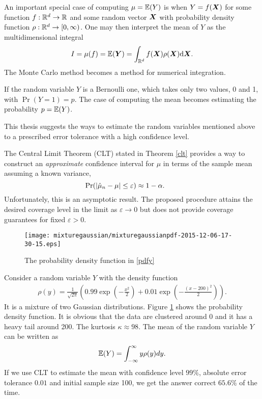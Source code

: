 \documentclass{iitthesis}
\theoremstyle{definition}
\begin{document}
An important special case of computing $\mu=\mathbb{E}(Y)$ is when $Y = f(\boldsymbol{X})$ for some function $f:\mathbb{R}^d \to \mathbb{R}$ and some random vector $\boldsymbol{X}$ with probability density function $\rho: \mathbb{R}^d \to [0,\infty)$. One may then interpret the mean of $Y$ as the multidimensional integral
\begin{align*}
I= \mu(f) = \mathbb{E}(\boldsymbol{Y}) = \int_{\mathbb{R}^d}f(\boldsymbol{X})\rho(\boldsymbol{X}){\rm d} \boldsymbol{X}.
\end{align*}
The Monte Carlo method becomes a method for numerical integration.

If the random variable $Y$ is a Bernoulli one, which takes only two values, 0 and 1, with  $\Pr(Y=1) =p$. The case of computing the mean becomes estimating the probability $p = \mathbb{E}(Y)$. 

This thesis suggests the ways to estimate the random variables mentioned above to a prescribed error tolerance with a high confidence level.


The Central Limit Theorem (CLT) stated in Theorem \ref{clt} provides a way to construct an \emph{approximate} confidence interval for $\mu$ in terms of the sample mean assuming a known variance,
\[
\Pr(\left \lvert \hat{\mu}_{n}-\mu \right \rvert \le \varepsilon) \approx 1- \alpha. \qquad \]
Unfortunately, this is an asymptotic result. The proposed procedure attains the desired coverage level in the limit as $\varepsilon\to 0$ but does not provide coverage guarantees for fixed $\varepsilon>0$.  

\begin{figure}[htbp]
\centering
\begin{minipage}{7cm}\centering 
\texttt{[image: mixturegaussian/mixturegaussianpdf-2015-12-06-17-30-15.eps]} 
\end{minipage}
\caption{The probability density function in \eqref{pdfy}}\label{fig:mixturegaussianpdf}
 \end{figure}
 
Consider a random variable $Y$ with the density function 
\begin{align}\label{pdfy}
\rho(y) = \frac{1}{\sqrt{2\pi}}\left(0.99\exp\left(-\frac{x^2}{2}\right)+0.01\exp\left(-\frac{(x-200)^2}{2}\right)\right).
\end{align}
It is a mixture of two Gaussian distributions. Figure \ref{fig:mixturegaussianpdf} shows the probability density function. It is obvious that the data are clustered around 0 and it has a heavy tail around 200. The kurtosis $\kappa \approx 98$. The mean of the random variable $Y$ can be written as
$$\mathbb{E}(Y) = \int_{-\infty}^\infty y\rho(y)dy.$$
If we use CLT to estimate the mean with confidence level $99\%$, absolute error tolerance $0.01$ and initial sample size 100, we get the answer correct $65.6\%$ of the time.
\end{document}
